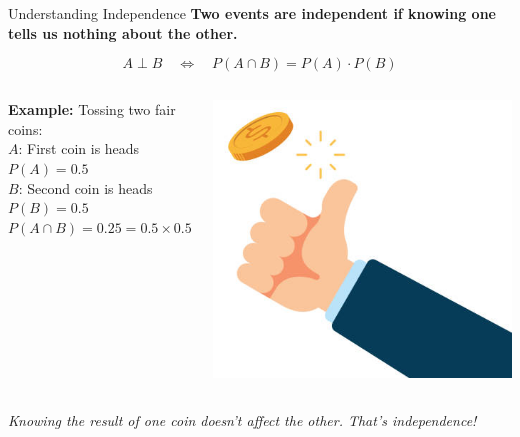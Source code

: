 \documentclass[handout,aspectratio=169]{beamer}
\begin{document}
\begin{frame}{Understanding Independence}
  \textbf{Two events are independent if knowing one tells us nothing about the other.}

  \vspace{1em}
  \[
    A \perp B \quad \Leftrightarrow \quad P(A \cap B) = P(A) \cdot P(B)
  \]

  \vspace{1em}
  \begin{columns}
\textbf{Example:} Tossing two fair coins:\\
  \quad $A$: First coin is heads \quad $P(A) = 0.5$\\
  \quad $B$: Second coin is heads \quad $P(B) = 0.5$\\
  \quad $P(A \cap B) = 0.25 = 0.5 \times 0.5$
  
    \includegraphics[width=0.6\linewidth]{chapter_figs/01_figs/toss.png}
\end{columns}
  

  \vspace{1em}
  \textit{Knowing the result of one coin doesn’t affect the other. That’s independence!}
\end{frame}
\end{document}
